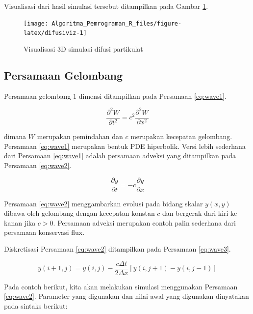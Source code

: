 \documentclass[
]{book}
\theoremstyle{definition}
\theoremstyle{definition}
\theoremstyle{definition}
\theoremstyle{definition}
\theoremstyle{remark}
\begin{document}
Visualisasi dari hasil simulasi tersebut ditampilkan pada Gambar \ref{fig:difusiviz}.

\begin{figure}

{\centering \texttt{[image: Algoritma\_Pemrograman\_R\_files/figure-latex/difusiviz-1]} 

}

\caption{Visualisasi 3D simulasi difusi partikulat}\label{fig:difusiviz}
\end{figure}

\hypertarget{persamaan-gelombang}{%
\subsection{Persamaan Gelombang}\label{persamaan-gelombang}}

Persamaan gelombang 1 dimensi ditampilkan pada Persamaan \eqref{eq:wave1}.

\begin{equation}
\frac{\partial^2W}{\partial t^2}=c^2\frac{\partial^2W}{\partial x^2}
  \label{eq:wave1}
\end{equation}

dimana \(W\) merupakan pemindahan dan \(c\) merupakan kecepatan gelombang. Persamaan \eqref{eq:wave1} merupakan bentuk PDE hiperbolik. Versi lebih sederhana dari Persamaan \eqref{eq:wave1} adalah persamaan adveksi yang ditampilkan pada Persamaan \eqref{eq:wave2}.

\begin{equation}
\frac{\partial y}{\partial t}=-c\frac{\partial y}{\partial x}
  \label{eq:wave2}
\end{equation}

Persamaan \eqref{eq:wave2} menggambarkan evolusi pada bidang skalar \(y\left(x,y\right)\) dibawa oleh gelombang dengan kecepatan konstan \(c\) dan bergerak dari kiri ke kanan jika \(c>0\). Persamaan adveksi merupakan contoh palin sederhana dari persamaan konservasi flux.

Diskretisasi Persamaan \eqref{eq:wave2} ditampilkan pada Persamaan \eqref{eq:wave3}.

\begin{equation}
y\left(i+1,j\right)=y\left(i,j\right)-\frac{c\Delta t}{2\Delta x}\left[y\left(i,j+1\right)-y\left(i,j-1\right)\right]
  \label{eq:wave3}
\end{equation}

Pada contoh berikut, kita akan melakukan simulasi menggunakan Persamaan \eqref{eq:wave2}. Parameter yang digunakan dan nilai awal yang digunakan dinyatakan pada sintaks berikut:
\end{document}
